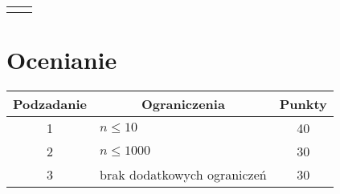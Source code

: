 \documentclass{article}
\begin{document}
\begin{sloppypar}
\begin{tabularx}{\textwidth}{*{2}{|>{\ttfamily}X}|}
    \hline
         & 
    \\ \hline
\end{tabularx}

\section{Ocenianie}
\begin{center}
    \begin{tabularx}{0.8\textwidth}{|c|X|c|}
        \hline
            \multicolumn{1}{|c|}{\textbf{Podzadanie}}
        &
            \multicolumn{1}{c|}{\textbf{Ograniczenia}}
        &
            \multicolumn{1}{c|}{\textbf{Punkty}}
        \\ \hline
            1
        &
            $n \leq 10$
        &
            40
        \\ \hline
            2
        &
            $n \leq 1000$
        &
            30
        \\ \hline
            3
        &
            brak dodatkowych ograniczeń
        &
            30
        \\ \hline
    \end{tabularx}
\end{center}

\end{sloppypar}
\end{document}
